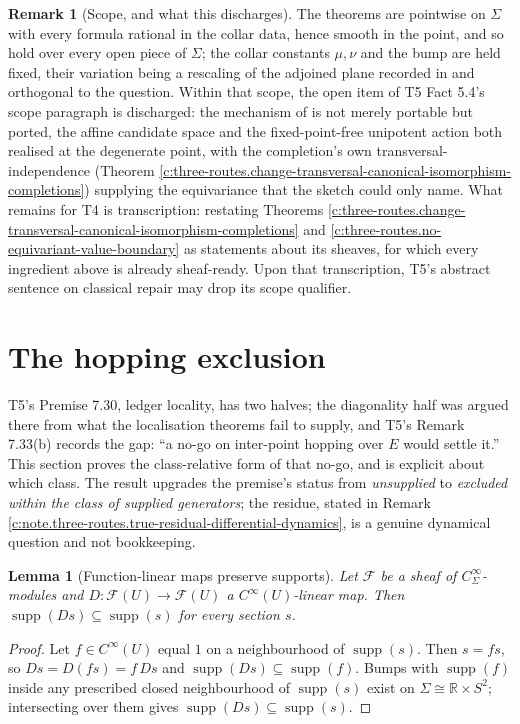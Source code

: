 \documentclass[11pt]{article}
\newtheorem{lemma}[theorem]{Lemma}
\theoremstyle{definition}
\newtheorem{remark}[theorem]{Remark}
\theoremstyle{plain}
\providecommand{\R}{}\renewcommand{\R}{\mathbb{R}}
\providecommand{\Sig}{}\renewcommand{\Sig}{\Sigma}
\providecommand{\supp}{}\renewcommand{\supp}{\operatorname{supp}}
\begin{document}
\begin{remark}[Scope, and what this discharges]\label{c:note.three-routes.scope-what-discharges}
The theorems are pointwise on $\Sig$ with every formula rational in the collar data, hence smooth in the point, and so hold over every open piece of $\Sig$; the collar constants $\mu, \nu$ and the bump are held fixed, their variation being a rescaling of the adjoined plane recorded in \cite[\S 4]{ButlerT4} and orthogonal to the question. Within that scope, the open item of T5 Fact 5.4's scope paragraph is discharged: the mechanism of \cite[Thm.~4.2]{ButlerT1} is not merely portable but ported, the affine candidate space and the fixed-point-free unipotent action both realised at the degenerate point, with the completion's own transversal-independence (Theorem \ref{c:three-routes.change-transversal-canonical-isomorphism-completions}) supplying the equivariance that the sketch could only name. What remains for T4 is transcription: restating Theorems \ref{c:three-routes.change-transversal-canonical-isomorphism-completions} and \ref{c:three-routes.no-equivariant-value-boundary} as statements about its sheaves, for which every ingredient above is already sheaf-ready. Upon that transcription, T5's abstract sentence on classical repair may drop its scope qualifier.
\end{remark}

\section{The hopping exclusion}

\label{c:note.three-routes.setting-hopping-exclusion}
T5's Premise 7.30, ledger locality, has two halves; the diagonality half was argued there from what the localisation theorems fail to supply, and T5's Remark 7.33(b) records the gap: ``a no-go on inter-point hopping over $E$ would settle it.'' This section proves the class-relative form of that no-go, and is explicit about which class. The result upgrades the premise's status from \emph{unsupplied} to \emph{excluded within the class of supplied generators}; the residue, stated in Remark \ref{c:note.three-routes.true-residual-differential-dynamics}, is a genuine dynamical question and not bookkeeping.

\begin{lemma}[Function-linear maps preserve supports]\label{c:three-routes.function-linear-maps-preserve-supports}
Let $\mathcal{F}$ be a sheaf of $C^\infty_\Sig$-modules and $D : \mathcal{F}(U) \to \mathcal{F}(U)$ a $C^\infty(U)$-linear map. Then $\supp(Ds) \subseteq \supp(s)$ for every section $s$.
\end{lemma}
\begin{proof}
Let $f \in C^\infty(U)$ equal $1$ on a neighbourhood of $\supp(s)$. Then $s = fs$, so $Ds = D(fs) = f\,Ds$ and $\supp(Ds) \subseteq \supp(f)$. Bumps with $\supp(f)$ inside any prescribed closed neighbourhood of $\supp(s)$ exist on $\Sig \cong \R \times S^2$; intersecting over them gives $\supp(Ds) \subseteq \supp(s)$.

\end{proof}
\end{document}
